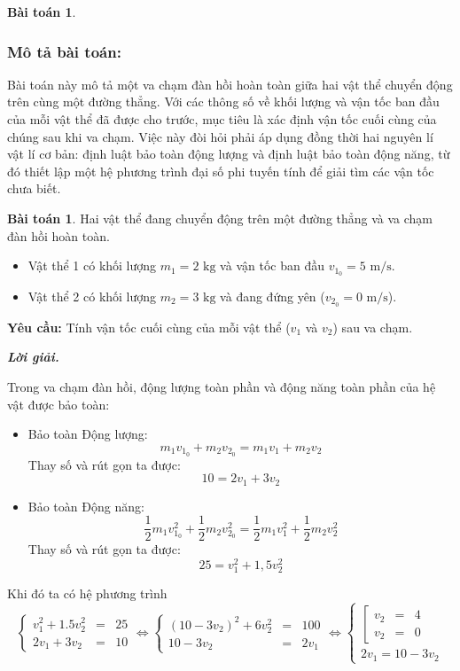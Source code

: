 \documentclass[12pt,a4paper,oneside]{book}
\theoremstyle{theorem}
\theoremstyle{definition}
\newtheorem{bt}[theorem2]{Bài toán}
\begin{document}
\begin{bt}
\subsubsection{Mô tả bài toán:} Bài toán này mô tả một va chạm đàn hồi hoàn toàn giữa hai vật thể chuyển động trên cùng một đường thẳng. Với các thông số về khối lượng và vận tốc ban đầu của mỗi vật thể đã được cho trước, mục tiêu là xác định vận tốc cuối cùng của chúng sau khi va chạm. Việc này đòi hỏi phải áp dụng đồng thời hai nguyên lí vật lí cơ bản: định luật bảo toàn động lượng và định luật bảo toàn động năng, từ đó thiết lập một hệ phương trình đại số phi tuyến tính để giải tìm các vận tốc chưa biết.
\begin{bt}
    Hai vật thể đang chuyển động trên một đường thẳng và va chạm đàn hồi hoàn toàn.
\begin{itemize}
    \item Vật thể 1 có khối lượng $m_1 = 2 \text{ kg}$ và vận tốc ban đầu $v_{1_0} = 5 \text{ m/s}$.
    \item Vật thể 2 có khối lượng $m_2 = 3 \text{ kg}$ và đang đứng yên ($v_{2_0} = 0 \text{ m/s}$).
\end{itemize}

\textbf{Yêu cầu:} 
Tính vận tốc cuối cùng của mỗi vật thể ($v_{1}$ và $v_{2}$) sau va chạm.

\textbf{\textit{Lời giải.}}

Trong va chạm đàn hồi, động lượng toàn phần và động năng toàn phần của hệ vật được bảo toàn:

\begin{itemize}
    \item {Bảo toàn Động lượng:}
    $$ m_1 v_{1_0} + m_2 v_{2_0} = m_1 v_{1} + m_2 v_{2} $$
    Thay số và rút gọn ta được:
    $$ 10 = 2v_{1} + 3v_{2}  $$

    \item {Bảo toàn Động năng:}
    $$ \frac{1}{2}m_1 v_{1_0}^2 + \frac{1}{2}m_2 v_{2_0}^2 = \frac{1}{2}m_1 v_{1}^2 + \frac{1}{2}m_2 v_{2}^2 $$
    Thay số và rút gọn ta được:
    $$ 25 = v_{1}^2 + 1,5v_{2}^2$$
\end{itemize}

Khi đó ta có hệ phương trình \[
    \left\{
\begin{array}{lclclclclcl}
 v_{1}^2 + 1.5v_{2}^2 &=& 25\\
 2v_{1} + 3v_{2} &=& 10
\end{array}
\right.\Leftrightarrow\left\{
\begin{array}{lclclclclcl}
 (10-3v_2)^2 + 6v_{2}^2 &=& 100\\
 10- 3v_{2} &=& 2v_{1} 
\end{array}
\right.\Leftrightarrow\left\{
\begin{array}{lclclclclcl}
 \left[
\begin{array}{lclclclclcl}
 v_2 &=& 4\\
 v_{2}  &=& 0
\end{array}
\right.\\
 2v_{1}  = 10- 3v_{2}
\end{array}
\right.
\]


\end{bt}
\end{bt}
\end{document}
